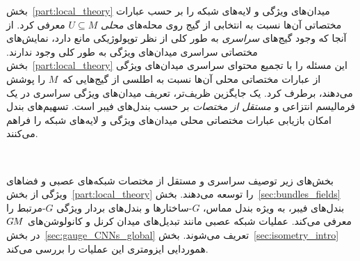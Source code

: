 


\label{part:bundle_theory}

بخش~\ref{part:local_theory} میدان‌های ویژگی و لایه‌های شبکه را بر حسب عبارات مختصاتی آن‌ها نسبت به انتخابی از گیج روی محله‌های \emph{محلی} $U\subseteq M$ معرفی کرد.
از آنجا که وجود گیج‌های \emph{سراسری} به طور کلی از نظر توپولوژیکی مانع دارد، نمایش‌های مختصاتی سراسری میدان‌های ویژگی به طور کلی وجود ندارند.
بخش~\ref{part:local_theory} این مسئله را با تجمیع محتوای سراسری میدان‌های ویژگی از عبارات مختصاتی محلی آن‌ها نسبت به اطلسی از گیج‌هایی که~$M$ را پوشش می‌دهند، برطرف کرد.
یک جایگزین ظریف‌تر، تعریف میدان‌های ویژگی سراسری در یک فرمالیسم انتزاعی و \emph{مستقل از مختصات} بر حسب بندل‌های فیبر است.
تسهیم‌های بندل امکان بازیابی عبارات مختصاتی محلی میدان‌های ویژگی و لایه‌های شبکه را فراهم می‌کنند.

\etocsettocstyle{}{} %
\localtableofcontents

~

بخش‌های زیر توصیف سراسری و مستقل از مختصات شبکه‌های عصبی و فضاهای ویژگی از بخش~\ref{part:local_theory} را توسعه می‌دهند.
بخش~\ref{sec:bundles_fields} بندل‌های فیبر، به ویژه بندل مماس، $G$-ساختارها و بندل‌های بردار ویژگی $G$-مرتبط را معرفی می‌کند.
عملیات شبکه عصبی مانند تبدیل‌های میدان کرنل و کانولوشن‌های $G\mkern-1.4muM$ در بخش~\ref{sec:gauge_CNNs_global} تعریف می‌شوند.
بخش~\ref{sec:isometry_intro} هموردایی ایزومتری این عملیات را بررسی می‌کند.